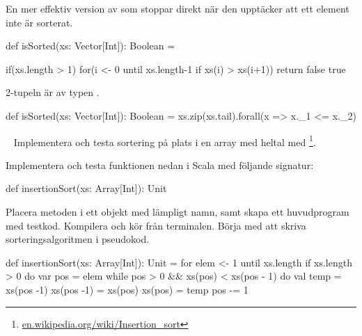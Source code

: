 \SubtaskSolved

En mer effektiv version av  som stoppar direkt när den upptäcker att ett element inte är sorterat.

\begin{Code}
def isSorted(xs: Vector[Int]): Boolean = {

  if(xs.length > 1){
    for(i <- 0 until xs.length-1 if xs(i) > xs(i+1)){
      return false
    }
  }
  true
}
\end{Code}

\SubtaskSolved

2-tupeln är av typen .

\begin{Code}
def isSorted(xs: Vector[Int]): Boolean =
  xs.zip(xs.tail).forall(x => x._1 <= x._2)
\end{Code}



\QUESTEND







\QUESTBEGIN

\Task  \what~ Implementera och testa sortering på plats i en array med heltal med \footnote{\href{https://en.wikipedia.org/wiki/Insertion_sort}{en.wikipedia.org/wiki/Insertion\_sort}}.

Implementera och testa funktionen nedan i Scala med följande signatur:
\begin{Code}
  def insertionSort(xs: Array[Int]): Unit
\end{Code}
Placera metoden i ett objekt med lämpligt namn, samt skapa ett huvudprogram med testkod. Kompilera och kör från terminalen. Börja med att skriva sorteringsalgoritmen i pseudokod.


\SOLUTION


\TaskSolved \what


\begin{Code}
def insertionSort(xs: Array[Int]): Unit = 
  for elem <- 1 until xs.length if xs.length > 0 do
    var pos = elem
    while pos > 0 && xs(pos) < xs(pos - 1) do
      val temp = xs(pos -1)
      xs(pos -1) = xs(pos)
      xs(pos) = temp
      pos -= 1
\end{Code}

